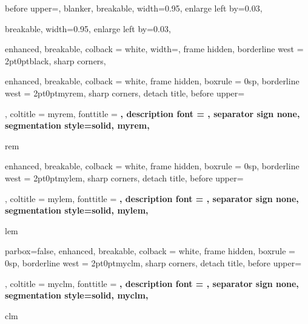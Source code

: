 
\newenvironment{myproof}[1][\proofname]{%
	\proof[\bfseries #1: ]
}{\endproof}

{%
  before upper={\setlength{\parskip}{5pt}},
  blanker,
	breakable,
	width=0.95\textwidth,
  enlarge left by=0.03\textwidth,
}

{%
	breakable,
	width=0.95\textwidth,
  enlarge left by=0.03\textwidth,
}

{%
	enhanced,
	breakable,
	colback = white,
	width=\textwidth,
	frame hidden,
	borderline west = {2pt}{0pt}{black},
	sharp corners,
}

{%
	enhanced,
	breakable,
	colback = white,
	frame hidden,
	boxrule = 0sp,
	borderline west = {2pt}{0pt}{myrem},
	sharp corners,
	detach title,
  before upper={\setlength{\parskip}{5pt}\tcbtitle\par\smallskip},
	coltitle = myrem,
	fonttitle = \bfseries\sffamily,
	description font = \mdseries,
	separator sign none,
	segmentation style={solid, myrem},
}{rem}

{%
	enhanced,
	breakable,
	colback = white,
	frame hidden,
	boxrule = 0sp,
	borderline west = {2pt}{0pt}{mylem},
	sharp corners,
	detach title,
  before upper={\setlength{\parskip}{5pt}\tcbtitle\par\smallskip},
	coltitle = mylem,
	fonttitle = \bfseries\sffamily,
	description font = \mdseries,
	separator sign none,
	segmentation style={solid, mylem},
}{lem}

{%
  parbox=false,
	enhanced,
	breakable,
	colback = white,
	frame hidden,
	boxrule = 0sp,
	borderline west = {2pt}{0pt}{myclm},
	sharp corners,
	detach title,
  before upper={\setlength{\parskip}{5pt}\tcbtitle\par\smallskip},
	coltitle = myclm,
	fonttitle = \bfseries\sffamily,
	description font = \mdseries,
	separator sign none,
	segmentation style={solid, myclm},
}{clm}

\makeatletter
{}
\makeatother

